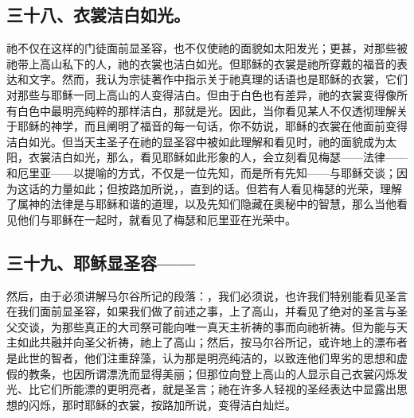 
\subsection{三十八、衣裳洁白如光。}

祂不仅在这样的门徒面前显圣容，也不仅使祂的面貌如太阳发光；更甚，对那些被祂带上高山私下的人，祂的衣裳也洁白如光。但耶稣的衣裳是祂所穿戴的福音的表达和文字。然而，我认为宗徒著作中指示关于祂真理的话语也是耶稣的衣裳，它们对那些与耶稣一同上高山的人变得洁白。但由于白色也有差异，祂的衣裳变得像所有白色中最明亮纯粹的那样洁白，那就是光。因此，当你看见某人不仅透彻理解关于耶稣的神学，而且阐明了福音的每一句话，你不妨说，耶稣的衣裳在他面前变得洁白如光。但当天主圣子在祂的显圣容中被如此理解和看见时，祂的面貌成为太阳，衣裳洁白如光，那么，看见耶稣如此形象的人，会立刻看见梅瑟——法律——和厄里亚——以提喻的方式，不仅是一位先知，而是所有先知——与耶稣交谈；因为这话的力量如此；但按路加所说，，直到的话。但若有人看见梅瑟的光荣，理解了属神的法律是与耶稣和谐的道理，以及先知们隐藏在奥秘中的智慧，那么当他看见他们与耶稣在一起时，就看见了梅瑟和厄里亚在光荣中。\par


\subsection{三十九、耶稣显圣容——}

然后，由于必须讲解马尔谷所记的段落：，我们必须说，也许我们特别能看见圣言在我们面前显圣容，如果我们做了前述之事，上了高山，并看见了绝对的圣言与圣父交谈，为那些真正的大司祭可能向唯一真天主祈祷的事而向祂祈祷。但为能与天主如此共融并向圣父祈祷，祂上了高山；然后，按马尔谷所记，或许地上的漂布者是此世的智者，他们注重辞藻，认为那是明亮纯洁的，以致连他们卑劣的思想和虚假的教条，也因所谓漂洗而显得美丽；但那位向登上高山的人显示自己衣裳闪烁发光、比它们所能漂的更明亮者，就是圣言；祂在许多人轻视的圣经表达中显露出思想的闪烁，那时耶稣的衣裳，按路加所说，变得洁白灿烂。\par


